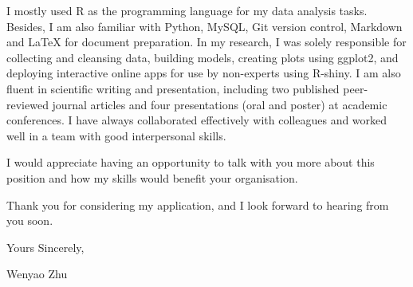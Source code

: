 \documentclass[11pt, a4paper, twoside]{article}
\begin{document}
I mostly used R as the programming language for my data analysis tasks. Besides, I am also familiar with Python, MySQL, Git version control, Markdown and LaTeX for document preparation. In my research, I was solely responsible for collecting and cleansing data, building models, creating plots using ggplot2, and deploying interactive online apps for use by non-experts using R-shiny. I am also fluent in scientific writing and presentation, including two published peer-reviewed journal articles and four presentations (oral and poster) at academic conferences. I have always collaborated effectively with colleagues and worked well in a team with good interpersonal skills.\par\vspace{2ex}

I would appreciate having an opportunity to talk with you more about this position and how my skills would benefit your organisation.\par\vspace{2ex}

Thank you for considering my application, and I look forward to hearing from you soon.\par\vspace{2ex}

Yours Sincerely,\par\vspace{1ex}
Wenyao Zhu
\end{document}
